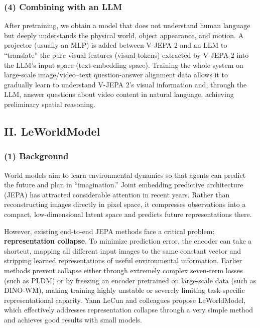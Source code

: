 \hypertarget{combining-with-an-llm}{%
\subsubsection{(4) Combining with an LLM}\label{combining-with-an-llm}}

After pretraining, we obtain a model that does not understand human language but deeply understands the physical world, object appearance, and motion. A projector (usually an MLP) is added between V-JEPA 2 and an LLM to ``translate'' the pure visual features (visual tokens) extracted by V-JEPA 2 into the LLM's input space (text-embedding space). Training the whole system on large-scale image/video--text question-answer alignment data allows it to gradually learn to understand V-JEPA 2's visual information and, through the LLM, answer questions about video content in natural language, achieving preliminary spatial reasoning.

\hypertarget{ii.-leworldmodel}{%
\subsection{II. LeWorldModel}\label{ii.-leworldmodel}}

\hypertarget{background-5}{%
\subsubsection{(1) Background}\label{background-5}}

World models aim to learn environmental dynamics so that agents can predict the future and plan in ``imagination.'' Joint embedding predictive architecture (JEPA) has attracted considerable attention in recent years. Rather than reconstructing images directly in pixel space, it compresses observations into a compact, low-dimensional latent space and predicts future representations there.

However, existing end-to-end JEPA methods face a critical problem: \textbf{representation collapse}. To minimize prediction error, the encoder can take a shortcut, mapping all different input images to the same constant vector and stripping learned representations of useful environmental information. Earlier methods prevent collapse either through extremely complex seven-term losses (such as PLDM) or by freezing an encoder pretrained on large-scale data (such as DINO-WM), making training highly unstable or severely limiting task-specific representational capacity.
Yann LeCun and colleagues propose LeWorldModel, which effectively addresses representation collapse through a very simple method and achieves good results with small models.

